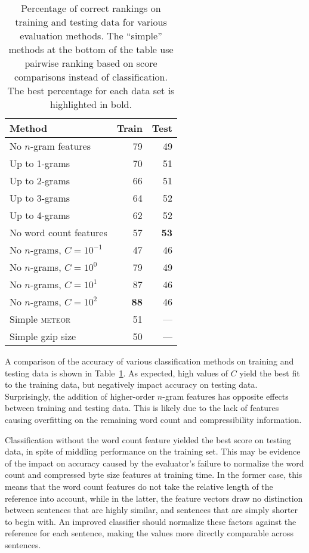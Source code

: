 \documentclass[11pt,twocolumn]{article}
\begin{document}
\begin{table}
\center
\begin{tabular}{lrr}\\
\textbf{Method} &
\textbf{Train} &
\textbf{Test} \\
\hline
\hline
No $n$-gram features        & 79 & 49 \\
Up to 1-grams               & 70 & 51 \\
Up to 2-grams               & 66 & 51 \\
Up to 3-grams               & 64 & 52 \\
Up to 4-grams               & 62 & 52 \\
\hline
No word count features      & 57 & \textbf{53} \\
\hline
No $n$-grams, $C=10^{-1}$   & 47 & 46 \\
No $n$-grams, $C=10^0$      & 79 & 49 \\
No $n$-grams, $C=10^1$      & 87 & 46 \\
No $n$-grams, $C=10^2$      & \textbf{88} & 46 \\
\hline
Simple \textsc{meteor}      & 51 & --- \\
Simple gzip size            & 50 & ---
\end{tabular}
\caption{\label{tab:accuracy}
Percentage of correct rankings on training and testing data for various
evaluation methods.
The ``simple'' methods at the bottom of the table use pairwise ranking
based on score comparisons instead of classification.
The best percentage for each data set is highlighted in bold.}
\end{table}

A comparison of the accuracy of various classification methods on
training and testing data is shown in Table~\ref{tab:accuracy}.
As expected, high values of $C$ yield the best fit to the training
data, but negatively impact accuracy on testing data.
Surprisingly, the addition of higher-order $n$-gram features has
opposite effects between training and testing data.
This is likely due to the lack of features causing overfitting on the
remaining word count and compressibility information.

Classification without the word count feature yielded the best score on
testing data, in spite of middling performance on the training set.
This may be evidence of the impact on accuracy caused by the evaluator's
failure to normalize the word count and compressed byte size features at
training time.
In the former case, this means that the word count features do not take
the relative length of the reference into account,
while in the latter, the feature vectors draw no distinction between
sentences that are highly similar, and sentences that are simply
shorter to begin with.
An improved classifier should normalize these factors against the
reference for each sentence, making the values more directly comparable
across sentences.
\end{document}
